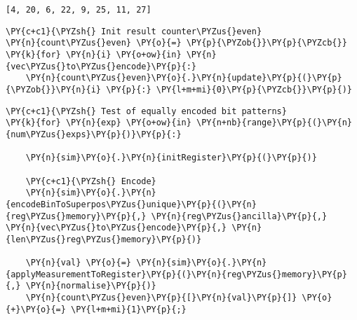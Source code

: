             \begin{tcolorbox}[breakable, boxrule=.5pt, size=fbox, pad at break*=1mm, opacityfill=0]
\begin{Verbatim}[commandchars=\\\{\}]
[4, 20, 6, 22, 9, 25, 11, 27]
\end{Verbatim}
\end{tcolorbox}
        
    \begin{tcolorbox}[breakable, size=fbox, boxrule=1pt, pad at break*=1mm,colback=cellbackground, colframe=cellborder]
\begin{Verbatim}[commandchars=\\\{\}]
\PY{c+c1}{\PYZsh{} Init result counter\PYZus{}even}
\PY{n}{count\PYZus{}even} \PY{o}{=} \PY{p}{\PYZob{}}\PY{p}{\PYZcb{}}
\PY{k}{for} \PY{n}{i} \PY{o+ow}{in} \PY{n}{vec\PYZus{}to\PYZus{}encode}\PY{p}{:}
    \PY{n}{count\PYZus{}even}\PY{o}{.}\PY{n}{update}\PY{p}{(}\PY{p}{\PYZob{}}\PY{n}{i} \PY{p}{:} \PY{l+m+mi}{0}\PY{p}{\PYZcb{}}\PY{p}{)}
\end{Verbatim}
\end{tcolorbox}

    \begin{tcolorbox}[breakable, size=fbox, boxrule=1pt, pad at break*=1mm,colback=cellbackground, colframe=cellborder]
\begin{Verbatim}[commandchars=\\\{\}]
\PY{c+c1}{\PYZsh{} Test of equally encoded bit patterns}
\PY{k}{for} \PY{n}{exp} \PY{o+ow}{in} \PY{n+nb}{range}\PY{p}{(}\PY{n}{num\PYZus{}exps}\PY{p}{)}\PY{p}{:}

    \PY{n}{sim}\PY{o}{.}\PY{n}{initRegister}\PY{p}{(}\PY{p}{)}

    \PY{c+c1}{\PYZsh{} Encode}
    \PY{n}{sim}\PY{o}{.}\PY{n}{encodeBinToSuperpos\PYZus{}unique}\PY{p}{(}\PY{n}{reg\PYZus{}memory}\PY{p}{,} \PY{n}{reg\PYZus{}ancilla}\PY{p}{,} \PY{n}{vec\PYZus{}to\PYZus{}encode}\PY{p}{,} \PY{n}{len\PYZus{}reg\PYZus{}memory}\PY{p}{)}
    
    \PY{n}{val} \PY{o}{=} \PY{n}{sim}\PY{o}{.}\PY{n}{applyMeasurementToRegister}\PY{p}{(}\PY{n}{reg\PYZus{}memory}\PY{p}{,} \PY{n}{normalise}\PY{p}{)}
    \PY{n}{count\PYZus{}even}\PY{p}{[}\PY{n}{val}\PY{p}{]} \PY{o}{+}\PY{o}{=} \PY{l+m+mi}{1}\PY{p}{;}
\end{Verbatim}
\end{tcolorbox}

